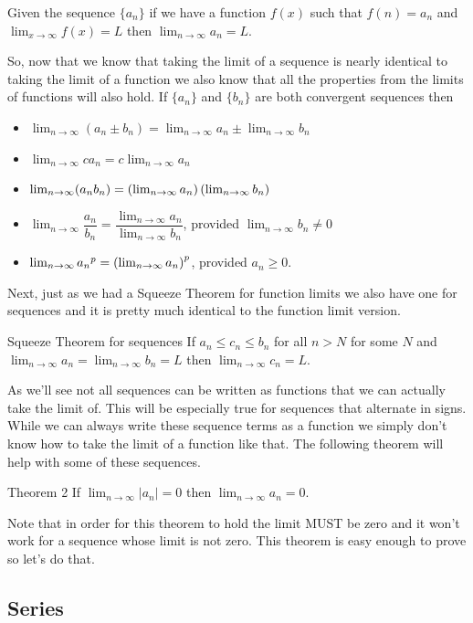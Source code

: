 \begin{thrm}{}{}
Given the sequence $\{a_n\}$ if we have a function $f(x)$ such that $f(n)=a_n$ and $\lim_{x\to\infty}f(x)=L$ then $\lim_{n\to\infty}a_n=L$.
\end{thrm}

So, now that we know that taking the limit of a sequence is nearly identical to taking the limit of a function we also know that all the properties from the limits of functions will also hold. If $\{a_n\}$ and $\{b_n\}$ are both convergent sequences then
\begin{itemize}
\item $\lim_{n\to\infty}(a_n\pm b_n)=\lim_{n\to\infty}a_n\pm\lim_{n\to\infty}b_n$
\item $\lim_{n\to\infty}ca_n=c\lim_{n\to\infty}a_n$
\item $\lim_{n\to\infty}(a_nb_n)=\left(\lim_{n\to\infty}a_n\right)\left(\lim_{n\to\infty}b_n\right)$
\item $\lim_{n\to\infty}\dfrac{a_n}{b_n}=\dfrac{\lim_{n\to\infty}a_n}{\lim_{n\to\infty}b_n}$, provided $\lim_{n\to\infty}b_n\neq0$
\item $\lim_{n\to\infty}{a_n}^p=\left(\lim_{n\to\infty}a_n\right)^p$, provided $a_n\ge0$.
\end{itemize}

Next, just as we had a Squeeze Theorem for function limits we also have one for sequences and it is pretty much identical to the function limit version.

\begin{thrm}{Squeeze Theorem for sequences}{}
If $a_n\le c_n\le b_n$ for all $n>N$ for some $N$ and $\lim_{n\to\infty}a_n=\lim_{n\to\infty}b_n=L$ then $\lim_{n\to\infty}c_n=L$.
\end{thrm}

As we’ll see not all sequences can be written as functions that we can actually take the limit of. This will be especially true for sequences that alternate in signs. While we can always write these sequence terms as a function we simply don’t know how to take the limit of a function like that. The following theorem will help with some of these sequences.

Theorem 2
If $\lim_{n\to\infty}|a_n|=0$ then $\lim_{n\to\infty}a_n=0$.

Note that in order for this theorem to hold the limit MUST be zero and it won’t work for a sequence whose limit is not zero. This theorem is easy enough to prove so let’s do that.

\subsection{Series}

